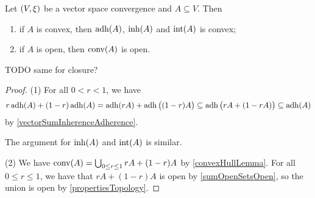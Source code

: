 \begin{proposition} \label{inherenceAdherenceConvex}
Let $\sSet{V,\xi}$ be a vector space convergence and $A\subseteq V$. Then
\begin{enumerate}
\item if $A$ is convex, then $\operatorname{adh}(A)$, $\operatorname{inh}(A)$ and $\operatorname{int}(A)$ is convex;
\item if $A$ is open, then $\operatorname{conv}(A)$ is open.
\end{enumerate}
\end{proposition}
TODO same for closure?
\begin{proof}
(1) For all $0<r<1$, we have
\[ r\operatorname{adh}(A) + (1-r)\operatorname{adh}(A) = \operatorname{adh}(rA) + \operatorname{adh}\big((1-r)A\big) \subseteq \operatorname{adh}\big(rA + (1-rA)\big) \subseteq \operatorname{adh}(A) \]
by \ref{vectorSumInherenceAdherence}. 

The argument for $\operatorname{inh}(A)$ and $\operatorname{int}(A)$ is similar.

(2) We have $\operatorname{conv}(A) = \bigcup_{0\leq r\leq 1} rA + (1-r)A$ by \ref{convexHullLemma}. For all $0\leq r\leq 1$, we have that $rA + (1-r)A$ is open by \ref{sumOpenSetsOpen}, so the union is open by \ref{propertiesTopology}.
\end{proof}


